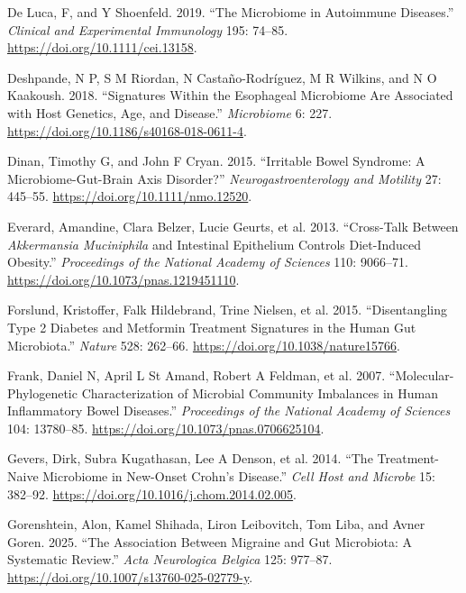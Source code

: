 \documentclass[
  11pt,
]{article}
\newlength{\cslhangindent}
\newenvironment{CSLReferences}[2] %
 {\begin{list}{}{%
  \setlength{\itemindent}{0pt}
  \setlength{\leftmargin}{0pt}
  \setlength{\parsep}{0pt}
  \ifodd #1
   \setlength{\leftmargin}{\cslhangindent}
   \setlength{\itemindent}{-1\cslhangindent}
  \fi
  \setlength{\itemsep}{#2\baselineskip}}}
 {\end{list}}
\begin{document}
\begin{CSLReferences}{1}{0}
De Luca, F, and Y Shoenfeld. 2019. {``The Microbiome in Autoimmune
Diseases.''} \emph{Clinical and Experimental Immunology} 195: 74--85.
\url{https://doi.org/10.1111/cei.13158}.

Deshpande, N P, S M Riordan, N Castaño-Rodríguez, M R Wilkins, and N O
Kaakoush. 2018. {``Signatures Within the Esophageal Microbiome Are
Associated with Host Genetics, Age, and Disease.''} \emph{Microbiome} 6:
227. \url{https://doi.org/10.1186/s40168-018-0611-4}.

Dinan, Timothy G, and John F Cryan. 2015. {``Irritable Bowel Syndrome: A
Microbiome-Gut-Brain Axis Disorder?''} \emph{Neurogastroenterology and
Motility} 27: 445--55. \url{https://doi.org/10.1111/nmo.12520}.

Everard, Amandine, Clara Belzer, Lucie Geurts, et al. 2013.
{``Cross-Talk Between \emph{{A}kkermansia Muciniphila} and Intestinal
Epithelium Controls Diet-Induced Obesity.''} \emph{Proceedings of the
National Academy of Sciences} 110: 9066--71.
\url{https://doi.org/10.1073/pnas.1219451110}.

Forslund, Kristoffer, Falk Hildebrand, Trine Nielsen, et al. 2015.
{``Disentangling Type 2 Diabetes and Metformin Treatment Signatures in
the Human Gut Microbiota.''} \emph{Nature} 528: 262--66.
\url{https://doi.org/10.1038/nature15766}.

Frank, Daniel N, April L St Amand, Robert A Feldman, et al. 2007.
{``Molecular-Phylogenetic Characterization of Microbial Community
Imbalances in Human Inflammatory Bowel Diseases.''} \emph{Proceedings of
the National Academy of Sciences} 104: 13780--85.
\url{https://doi.org/10.1073/pnas.0706625104}.

Gevers, Dirk, Subra Kugathasan, Lee A Denson, et al. 2014. {``The
Treatment-Naive Microbiome in New-Onset {C}rohn's Disease.''} \emph{Cell
Host and Microbe} 15: 382--92.
\url{https://doi.org/10.1016/j.chom.2014.02.005}.

Gorenshtein, Alon, Kamel Shihada, Liron Leibovitch, Tom Liba, and Avner
Goren. 2025. {``The Association Between Migraine and Gut Microbiota: A
Systematic Review.''} \emph{Acta Neurologica Belgica} 125: 977--87.
\url{https://doi.org/10.1007/s13760-025-02779-y}.


\end{CSLReferences}
\end{document}
